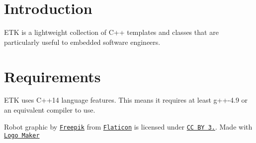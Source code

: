 \hypertarget{index_intro_sec}{}\section{Introduction}\label{index_intro_sec}
E\-T\-K is a lightweight collection of C++ templates and classes that are particularly useful to embedded software engineers.\hypertarget{index_requirements_sec}{}\section{Requirements}\label{index_requirements_sec}
E\-T\-K uses C++14 language features. This means it requires at least g++-\/4.9 or an equivalent compiler to use.

Robot graphic by \href{http://www.freepik.com/}{\tt Freepik} from \href{http://www.flaticon.com/}{\tt Flaticon} is licensed under \href{http://creativecommons.org/licenses/by/3.0/}{\tt C\-C B\-Y 3.}. Made with \href{http://logomakr.com}{\tt Logo Maker} 